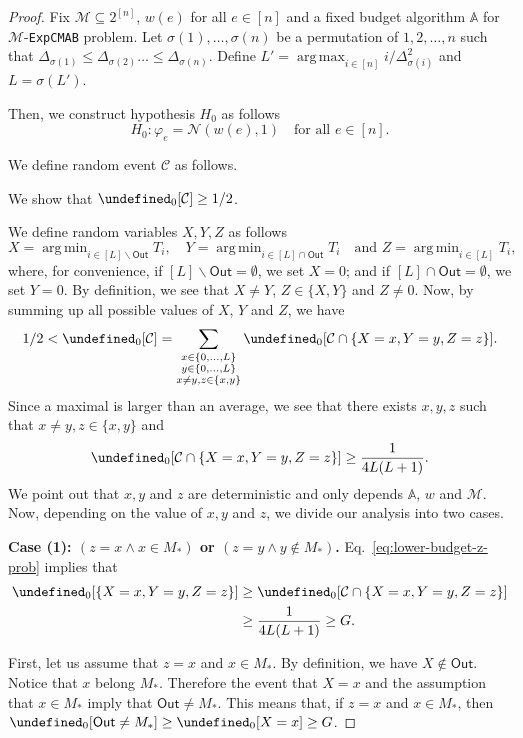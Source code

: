 \documentclass{article}
\newcommand{\Problem}{\texttt{ExpCMAB}\xspace}
\newcommand{\Rew}{\varphi}
\newcommand{\M}{\mathcal M}
\newcommand{\del}{\backslash}
\DeclareMathOperator*{\argmax}{arg\,max}
\DeclareMathOperator*{\argmin}{arg\,min}
\newcommand{\out}{\mathsf{Out}}
\let\Pr\undefined
\DeclareMathOperator{\Pr}{Pr}
\begin{document}
\begin{spacing}{1.1}
\begin{proof}
Fix $\M \subseteq 2^{[n]}$, $w(e)$ for all $e\in[n]$ and a fixed budget algorithm $\mathbb A$ for $\M$-\Problem problem.
Let $\sigma(1),\ldots,\sigma(n)$ be a permutation of $1,2,\ldots, n$ such that
 $\Delta_{\sigma(1)} \le \Delta_{\sigma(2)} \ldots \le \Delta_{\sigma(n)}$.
Define $L' = \argmax_{i\in [n]} i/\Delta_{\sigma(i)}^2$ and $L=\sigma(L')$.

Then, we construct hypothesis $H_0$ as follows
$$
H_0: \Rew_e = \mathcal N(w(e), 1) \quad \text{for all } e \in [n].
$$

We define random event $\mathcal C$ as follows.

We show that $\Pr_0[\mathcal C] \ge 1/2$.

We define random variables $X,Y,Z$ as follows
$$
X=\argmin_{i\in [L]\del \out} T_i, \quad Y=\argmin_{i\in [L]\cap \out} T_i \quad\text{and }
Z=\argmin_{i\in [L]} T_i, 
$$
where, for convenience, if $[L]\del \out=\emptyset$, we set $X=0$; and if $[L]\cap \out = \emptyset$, we set $Y=0$. 
By definition, we see that $X\not=Y$, $Z\in \{X,Y\}$ and $Z\not = 0$.
Now, by summing up all possible values of $X$, $Y$ and $Z$, we have
\begin{align*}
1/2 < \Pr_0[\mathcal C]
    = \sum_{\substack{x\in \{0,\ldots,L\}\\y\in \{0,\ldots, L\}\\x\not=y, z\in \{x,y\}}}
      \Pr_0[\mathcal C \cap \{X=x, Y=y, Z=z\}].
\end{align*}
Since a maximal is larger than an average, we see that there exists $x,y,z$ such that $x\not=y, z\in\{x,y\}$ and
\begin{equation}
\label{eq:lower-budget-z-prob}
\Pr_0[\mathcal C \cap \{X=x,Y=y,Z=z\}] \ge \frac{1}{4L(L+1)}.
\end{equation}
We point out that $x, y$ and $z$ are deterministic and only depends $\mathbb A$, $w$ and $\mathcal M$.
Now, depending on the value of $x,y$ and $z$, we divide our analysis into two cases.

\textbf{Case (1): $(z=x \wedge x\in M_*)$ or $(z=y \wedge y\not\in M_*)$.} 
Eq.~\eqref{eq:lower-budget-z-prob} implies that 
\begin{align*}
\Pr_0[\{X=x,Y=y,Z=z\}] &\ge \Pr_0[\mathcal C \cap \{X=x,Y=y,Z=z\}] \\
					   &\ge \frac{1}{4L(L+1)} \ge G. 
\end{align*}


First, let us assume that $z=x$ and $x\in M_*$.
By definition, we have $X\not\in\out$.
Notice that $x$ belong $M_*$. 
Therefore the event that $X=x$ and the assumption that $x\in M_*$ imply that $\out\not=M_*$.
This means that, if $z=x$ and $x\in M_*$, 
then $\Pr_0[\out\not=M_*] \ge \Pr_0[X=x] \ge G$.


\end{proof}
\end{spacing}
\end{document}
